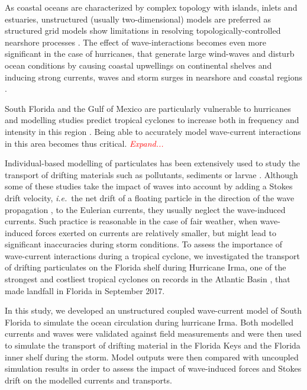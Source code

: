 \documentclass[11pt,a4paper]{article}
\newcommand{\emphc}[1]{\emph{\textcolor{red}{#1}}}
\newcommand{\ie}{{\it i.e.}\ }
\begin{document}
As coastal oceans are characterized by complex topology with islands, inlets and estuaries, unstructured (usually two-dimensional) models are preferred as structured grid models show limitations in resolving topologically-controlled nearshore processes \citep{wu2011fvcom, chen2007finite}. The effect of wave-interactions becomes even more significant in the case of hurricanes, that generate large wind-waves and disturb ocean conditions \citep{liu2020impacts} by causing coastal upwellings on continental shelves \citep{smith1982response} and inducing strong currents, waves and storm surges in nearshore and coastal regions \citep{dietrich2010high, weisberg2006hurricane}. 

South Florida and the Gulf of Mexico are particularly vulnerable to hurricanes \citep{malmstadt2009florida} and modelling studies predict tropical cyclones to increase both in frequency and intensity in this region \citep{marsooli2019climate, knutson2010tropical}. Being able to accurately model wave-current interactions in this area becomes thus critical. \emphc{Expand...}

Individual-based modelling of particulates has been extensively used to study the transport of drifting materials such as pollutants, sediments or larvae \citep{garcia2020measuring,liubartseva2018tracking, figueiredo2013synthesizing, frys2020fine}. Although some of these studies take the impact of waves into account by adding a Stokes drift velocity, \ie the net drift of a floating particle in the direction of the wave propagation \citep{van2018stokes}, to the Eulerian currents, they usually neglect the wave-induced currents. Such practice is reasonable in the case of fair weather, when wave-induced forces exerted on currents are relatively smaller, but might lead to significant inaccuracies during storm conditions. To assess the importance of wave-current interactions during a tropical cyclone, we investigated the transport of drifting particulates on the Florida shelf during Hurricane Irma, one of the strongest and costliest tropical cyclones on records in the Atlantic Basin \citep{chen2007finite}, that made landfall in Florida in September 2017.

In this study, we developed an unstructured coupled wave-current model of South Florida to simulate the ocean circulation during hurricane Irma. Both modelled currents and waves were validated against field measurements and were then used to simulate the transport of drifting material in the Florida Keys and the Florida inner shelf during the storm. Model outputs were then compared with uncoupled simulation results in order to assess the impact of wave-induced forces and Stokes drift on the modelled currents and transports.
\end{document}
